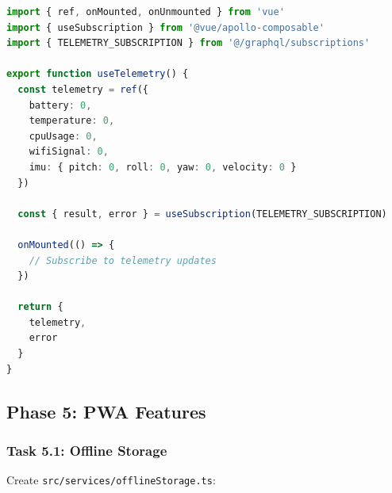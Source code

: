 \documentclass[11pt,letterpaper]{article}
\begin{document}
\begin{lstlisting}[language=TypeScript, caption=useTelemetry.ts]
import { ref, onMounted, onUnmounted } from 'vue'
import { useSubscription } from '@vue/apollo-composable'
import { TELEMETRY_SUBSCRIPTION } from '@/graphql/subscriptions'

export function useTelemetry() {
  const telemetry = ref({
    battery: 0,
    temperature: 0,
    cpuUsage: 0,
    wifiSignal: 0,
    imu: { pitch: 0, roll: 0, yaw: 0, velocity: 0 }
  })

  const { result, error } = useSubscription(TELEMETRY_SUBSCRIPTION)

  onMounted(() => {
    // Subscribe to telemetry updates
  })

  return {
    telemetry,
    error
  }
}
\end{lstlisting}

\subsection{Phase 5: PWA Features}

\subsubsection{Task 5.1: Offline Storage}

Create \texttt{src/services/offlineStorage.ts}:
\end{document}
